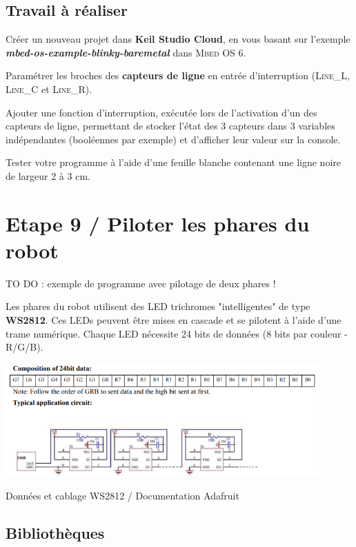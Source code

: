 \documentclass[a4paper,11pt,titlepage]{article} %
\begin{document}
\subsection{Travail à réaliser}

\Manip Créer un nouveau projet dans \textbf{Keil Studio Cloud}, en vous basant sur l'exemple \textbf{\textsl{mbed-os-example-blinky-baremetal}} dans \textsc{Mbed OS 6}.

\Manip Paramétrer les broches des \textbf{capteurs de ligne} en entrée d'interruption (\textsc{Line\_L}, \textsc{Line\_C} et \textsc{Line\_R}).

\Manip Ajouter une fonction d'interruption, exécutée lors de l'activation d'un des capteurs de ligne, permettant de stocker l'état des 3 capteurs dans 3 variables indépendantes (booléennes par exemple) et d'afficher leur valeur sur la console.

\Manip Tester votre programme à l'aide d'une feuille blanche contenant une ligne noire de largeur 2 à 3 cm.

\newpage
\section{Etape 9 / Piloter les phares du robot}

TO DO : exemple de programme avec pilotage de deux phares !

Les phares du robot utilisent des LED trichromes "intelligentes" de type \textbf{WS2812}. Ces LEDs peuvent être mises en cascade et se pilotent à l'aide d'une trame numérique. Chaque LED nécessite 24 bits de données (8 bits par couleur - R/G/B).

\begin{center}
	\includegraphics[width=0.9\textwidth]{images/W2812.png}
	
	Données et cablage WS2812 / Documentation Adafruit
\end{center}


\subsection{Bibliothèques }
\end{document}

